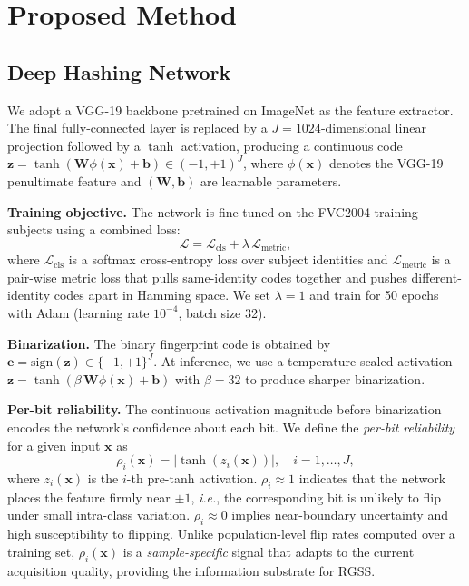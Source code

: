 \documentclass[journal]{IEEEtran}
\newcommand{\ie}{\textit{i.e.}}
\begin{document}
\section{Proposed Method}
\label{sec:method}

\subsection{Deep Hashing Network}
\label{sec:method:hash}

We adopt a VGG-19 \cite{simonyan2015vgg} backbone pretrained on
ImageNet as the feature extractor.
The final fully-connected layer is replaced by a $J=1024$-dimensional
linear projection followed by a $\tanh$ activation, producing a
continuous code $\mathbf{z} = \tanh(\mathbf{W}\phi(\mathbf{x})+\mathbf{b})
\in (-1,+1)^J$, where $\phi(\mathbf{x})$ denotes the VGG-19 penultimate
feature and $(\mathbf{W},\mathbf{b})$ are learnable parameters.

\noindent\textbf{Training objective.}
The network is fine-tuned on the FVC2004 training subjects
using a combined loss:
\begin{equation}
  \mathcal{L} = \mathcal{L}_{\text{cls}} + \lambda\,\mathcal{L}_{\text{metric}},
  \label{eq:loss}
\end{equation}
where $\mathcal{L}_{\text{cls}}$ is a softmax cross-entropy loss over
subject identities and $\mathcal{L}_{\text{metric}}$ is a
pair-wise metric loss that pulls same-identity codes together
and pushes different-identity codes apart in Hamming space.
We set $\lambda=1$ and train for 50 epochs with Adam
(learning rate $10^{-4}$, batch size 32).

\noindent\textbf{Binarization.}
The binary fingerprint code is obtained by
$\mathbf{e} = \text{sign}(\mathbf{z}) \in \{-1,+1\}^J$.
At inference, we use a temperature-scaled activation
$\mathbf{z} = \tanh(\beta\,\mathbf{W}\phi(\mathbf{x})+\mathbf{b})$
with $\beta=32$ to produce sharper binarization.

\noindent\textbf{Per-bit reliability.}
The continuous activation magnitude before binarization encodes the
network's confidence about each bit.
We define the \emph{per-bit reliability} for a given input $\mathbf{x}$ as
\begin{equation}
  \rho_i(\mathbf{x}) = |\tanh(z_i(\mathbf{x}))|, \quad i = 1,\ldots,J,
  \label{eq:reliability}
\end{equation}
where $z_i(\mathbf{x})$ is the $i$-th pre-tanh activation.
$\rho_i \approx 1$ indicates that the network places the feature
firmly near $\pm 1$, \ie, the corresponding bit is unlikely to
flip under small intra-class variation.
$\rho_i \approx 0$ implies near-boundary uncertainty and high
susceptibility to flipping.
Unlike population-level flip rates computed over a training set,
$\rho_i(\mathbf{x})$ is a \emph{sample-specific} signal
that adapts to the current acquisition quality,
providing the information substrate for RGSS.
\end{document}
